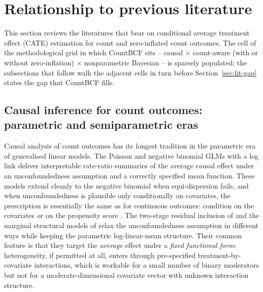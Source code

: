 \documentclass[11pt]{article}
\theoremstyle{plain}
\theoremstyle{definition}
\theoremstyle{remark}
\begin{document}
\section{Relationship to previous literature}\label{sec:litreview}

This section reviews the literatures that bear on conditional
average treatment effect (CATE) estimation for count and
zero-inflated count outcomes. The cell of the methodological grid in
which CountBCF sits -- causal $\times$ count-aware (with or without
zero-inflation) $\times$ nonparametric Bayesian -- is sparsely
populated; the subsections that follow walk the adjacent cells in
turn before Section~\ref{sec:lit-gap} states the gap that CountBCF
fills.

\subsection{Causal inference for count outcomes:
parametric and semiparametric eras}\label{sec:lit-count}

Causal analysis of count outcomes has its longest tradition in the
parametric era of generalised linear models. The Poisson and negative
binomial GLMs with a log link \citep{camerontrivedi2013count} deliver
interpretable rate-ratio summaries of the average causal effect under
an unconfoundedness assumption and a correctly specified mean
function. These models extend cleanly to the negative binomial when
equi-dispersion fails, and when unconfoundedness is plausible only
conditionally on covariates, the prescription is essentially the same
as for continuous outcomes: condition on the covariates or on the
propensity score \citep{rosenbaum1983central}. The two-stage residual
inclusion of \citet{terza2008twostage} and the marginal structural
models of \citet{robins2000marginal} relax the unconfoundedness
assumption in different ways while keeping the parametric
log-linear-mean structure. Their common feature is that they target
the \emph{average} effect under a \emph{fixed functional form}:
heterogeneity, if permitted at all, enters through pre-specified
treatment-by-covariate interactions, which is workable for a small
number of binary moderators but not for a moderate-dimensional
covariate vector with unknown interaction structure.
\end{document}
